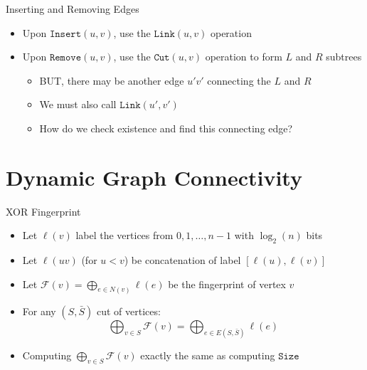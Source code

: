 \documentclass[aspectratio=169, handout]{beamer}
\newcommand{\insertE}{\texttt{Insert}}
\newcommand{\removeE}{\texttt{Remove}}
\newcommand{\linkET}{\texttt{Link}}
\newcommand{\cutET}{\texttt{Cut}}
\newcommand{\sizeET}{\texttt{Size}}
\renewcommand{\F}{\mathcal{F}}
\begin{document}
\begin{frame}{Inserting and Removing Edges}
    \begin{itemize}
        \item Upon $\insertE(u, v)$, use the $\linkET(u, v)$ operation
              \pause
        \item Upon $\removeE(u, v)$, use the $\cutET(u, v)$ operation to form $L$ and $R$ subtrees
              \pause
              \begin{itemize}
                  \item BUT, there may be another edge $u'v'$ connecting the $L$ and $R$
                        \pause
                  \item We must also call $\linkET(u', v')$
                        \pause
                  \item How do we check existence and find this connecting edge?
              \end{itemize}
    \end{itemize}
\end{frame}

\section{Dynamic Graph Connectivity}
\frame{\tableofcontents[currentsection]}

\begin{frame}{XOR Fingerprint}
    \begin{itemize}
        \item Let $\ell(v)$ label the vertices from $0, 1, \ldots, n-1$ with $\log_2(n)$ bits
              \pause
        \item Let $\ell(uv)$ (for $u < v$) be concatenation of label $[\ell(u), \ell(v)]$
              \pause
        \item Let $\F(v) = \bigoplus_{e \in N(v)} \ell(e)$ be the fingerprint of vertex $v$
              \pause
        \item For any $(S, \bar{S})$ cut of vertices:
              $$
                  \bigoplus_{v \in S} \F(v) = \bigoplus_{e \in E(S, \bar{S})} \ell(e)
              $$
              \pause
              \vspace{-\baselineskip}
        \item Computing $\bigoplus_{v \in S} \F(v)$ exactly the same as computing $\sizeET$
    \end{itemize}
\end{frame}
\end{document}
